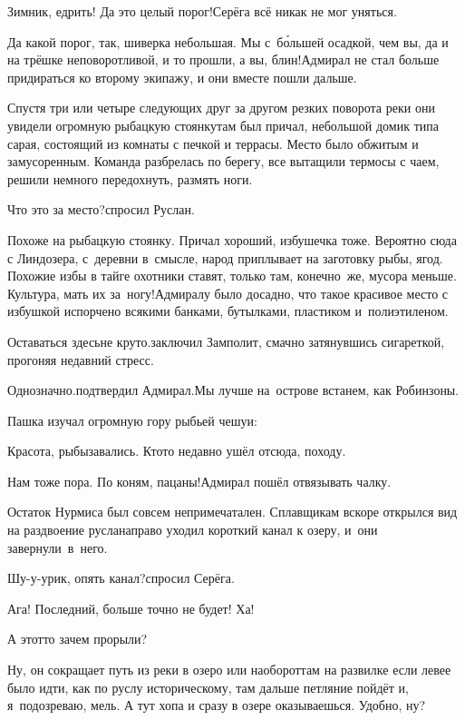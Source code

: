 \diagdash Зимник, едрить! Да это целый порог!\mdash Серёга всё никак не мог уняться.

\diagdash Да какой порог, так, шиверка небольшая. Мы с~б\'{о}льшей осадкой, чем вы, да и на трёшке неповоротливой, и то прошли, а вы, блин!\mdash Адмирал не стал больше придираться ко второму экипажу, и они вместе пошли дальше. 

Спустя три или четыре следующих друг за другом резких поворота реки они увидели огромную рыбацкую стоянку\mdash там был причал, небольшой домик типа сарая, состоящий из комнаты с печкой и террасы. Место было обжитым и замусоренным. Команда разбрелась по берегу, все вытащили термосы с чаем, решили немного передохнуть, размять ноги.

\diagdash Что это за место?\mdash спросил Руслан.

\diagdash Похоже на рыбацкую стоянку. Причал хороший, избушечка тоже. Вероятно сюда с Линдозера, с~деревни в~смысле, народ приплывает на заготовку рыбы, ягод. Похожие избы в тайге охотники ставят, только там, конечно~же, мусора меньше. Культура, мать их за~ногу!\mdash Адмиралу было досадно, что такое красивое место с избушкой испорчено всякими банками, бутылками, пластиком и~полиэтиленом.

\diagdash Оставаться здесь\mdash не круто.\mdash заключил Замполит, смачно затянувшись сигареткой, прогоняя недавний стресс.

\diagdash Однозначно.\mdash подтвердил Адмирал.\mdash Мы лучше на~острове встанем, как Робинзоны.

Пашка изучал огромную гору рыбьей чешуи:

\diagdash Красота, рыбы\mdash завались. Кто\sdash то недавно ушёл отсюда, походу.

\diagdash Нам тоже пора. По коням, пацаны!\mdash Адмирал пошёл отвязывать чалку.

Остаток Нурмиса был совсем непримечатален. Сплавщикам вскоре открылся вид на раздвоение русла\mdash направо уходил короткий канал к озеру, и~они завернули~в~него.

\diagdash Шу-у-урик, опять канал?\mdash спросил Серёга.

\diagdash Ага! Последний, больше точно не будет! Ха!

\diagdash А этот\sdash то зачем прорыли? 

\diagdash Ну, он сокращает путь из реки в озеро или наоборот\mdash там на развилке если левее было идти, как по руслу историческому, там дальше петляние пойдёт и, я~подозреваю, мель. А тут хопа и сразу в озере оказываешься. Удобно, ну?

